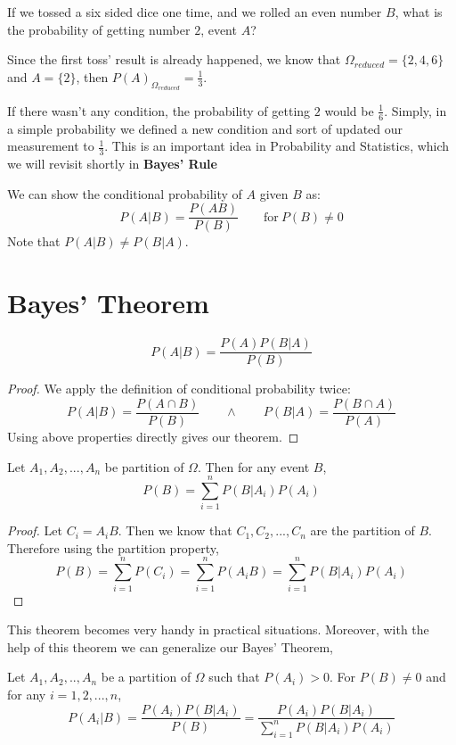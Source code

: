 \begin{example}
    If we tossed a six sided dice one time, and we rolled an even number $B$, what is the probability of getting number $2$, event $A$?

    Since the first toss' result is already happened, we know that  $\Omega_{reduced}=\{2,4,6\}$ and  $A = \{2\}$, then
    $P(A)_{\Omega_{reduced}}=\frac{1}{3}$.
\end{example}

If there wasn't any condition, the probability of getting $2$ would be $\frac{1}{6}$. Simply, in a simple probability we defined a new
condition and sort of updated our measurement to $\frac{1}{3}$. This is an important idea in Probability and Statistics, which we will
revisit shortly in \textbf{Bayes' Rule}
\begin{definition}
    We can show the conditional probability of $A$ given $B$ as:
    \[ P(A | B) = \frac{P(AB)}{P(B)} \qquad \text{for}\ P(B) \neq 0 \]
    Note that $P(A | B) \neq P(B | A)$.
\end{definition}

\section{Bayes' Theorem}

\begin{theorem}
    $$ P(A|B) = \frac{P(A)P(B|A)}{P(B)} $$

    \begin{proof}
        We apply the definition of conditional probability twice:
        $$ P(A|B) = \frac{P(A \cap B)}{P(B)} \qquad \land \qquad  P(B|A) = \frac{P(B \cap A)}{P(A)}$$
        Using above properties directly gives our theorem.
    \end{proof}
\end{theorem}

\begin{theorem} Let $A_1,A_2,...,A_n$ be partition of $\Omega$. Then for any event $B$,
    $$P(B)= \sum_{i=1}^n P(B|A_i)P(A_i)$$

    \begin{proof}
        Let $C_i=A_iB$. Then we know that $C_1,C_2,...,C_n$ are the partition of $B$. Therefore using the partition property,
        $$ P(B)= \sum_{i=1}^n P(C_i) = \sum_{i=1}^n P(A_i B) =\sum_{i=1}^n P(B|A_i)P(A_i) $$
    \end{proof}
\end{theorem}

\par
This theorem becomes very handy in practical situations. Moreover, with the help of this theorem we can generalize our Bayes' Theorem,

\begin{theorem} Let $A_1,A_2,..,A_n$ be a partition of $\Omega$ such that $P(A_i) > 0$. For $P(B) \neq 0$ and for any $i=1,2,...,n$,
    $$ P(A_i|B) = \frac{P(A_i) P(B|A_i)}{P(B)} =  \frac{P(A_i)  P(B|A_i)}{\sum_{i=1}^n P(B|A_i)P(A_i) }$$
\end{theorem}
